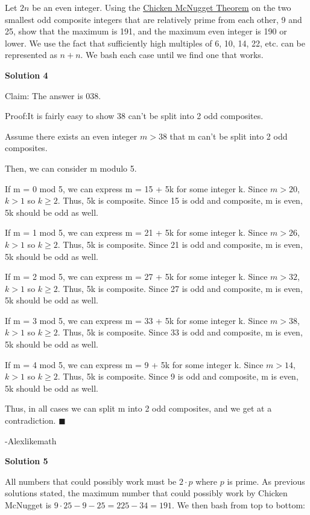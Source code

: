 \begin{enumerate}
Let $2n$ be an even integer. Using the \href{https://artofproblemsolving.com/wiki/index.php?title=Chicken\_McNugget\_Theorem}{Chicken McNugget Theorem} on the two smallest odd composite integers that are relatively prime from each other, 9 and 25, show that the maximum is 191, and the maximum even integer is 190 or lower. We use the fact that sufficiently high multiples of 6, 10, 14, 22, etc. can be represented as $n+n$. We bash each case until we find one that works.

 



\textbf{Solution 4}

Claim: The answer is $\boxed{038}$.

 Proof:It is fairly easy to show 38 can't be split into 2 odd composites.

 Assume there exists an even integer $m > 38$ that m can't be split into 2 odd composites.

 Then, we can consider m modulo 5.

 If m = 0 mod 5, we can express m = 15 + 5k for some integer k. Since $m > 20$, $k > 1$ so $k \geq 2$. Thus, 5k is composite. Since 15 is odd and composite, m is even, 5k should be odd as well. 

 If m = 1 mod 5, we can express m = 21 + 5k for some integer k. Since $m > 26$, $k > 1$ so $k \geq 2$. Thus, 5k is composite. Since 21 is odd and composite, m is even, 5k should be odd as well. 

 If m = 2 mod 5, we can express m = 27 + 5k for some integer k. Since $m > 32$, $k > 1$ so $k \geq 2$. Thus, 5k is composite. Since 27 is odd and composite, m is even, 5k should be odd as well. 

 If m = 3 mod 5, we can express m = 33 + 5k for some integer k. Since $m > 38$, $k > 1$ so $k \geq 2$. Thus, 5k is composite. Since 33 is odd and composite, m is even, 5k should be odd as well. 

 If m = 4 mod 5, we can express m = 9 + 5k for some integer k. Since $m > 14$, $k > 1$ so $k \geq 2$. Thus, 5k is composite. Since 9 is odd and composite, m is even, 5k should be odd as well. 

 Thus, in all cases we can split m into 2 odd composites, and we get at a contradiction. $\blacksquare$

 -Alexlikemath

 



\textbf{Solution 5}

All numbers that could possibly work must be $2 \cdot p$ where $p$ is prime. As previous solutions stated, the maximum number that could possibly work by Chicken McNugget is $9 \cdot 25 - 9 - 25 = 225-34 = 191$. We then bash from top to bottom:


\end{enumerate}
